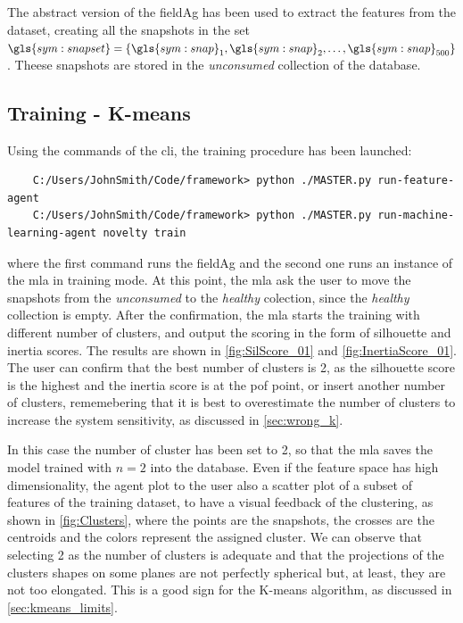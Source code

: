 The abstract version of the \gls{fieldAg} has been used to extract the features from the dataset, creating all the snapshots in the set $\gls{sym:snapset}=\{\gls{sym:snap}_1,\gls{sym:snap}_2,\dots,\gls{sym:snap}_{500}\}$. Theese snapshots are stored in the \emph{unconsumed} collection of the database.

\subsection{Training - K-means}

Using the commands of the \gls{cli}, the training procedure has been launched:
\begin{verbatim}
    C:/Users/JohnSmith/Code/framework> python ./MASTER.py run-feature-agent
    C:/Users/JohnSmith/Code/framework> python ./MASTER.py run-machine-learning-agent novelty train
\end{verbatim}

where the first command runs the \gls{fieldAg} and the second one runs an  instance of the \gls{mla} in training mode.
At this point, the \gls{mla} ask the user to move the snapshots from the \emph{unconsumed} to the \emph{healthy} colection, since the \emph{healthy} collection is empty. After the confirmation, the \gls{mla} starts the training with different number of clusters, and output the scoring in the form of silhouette and inertia scores. The results are shown in \autoref{fig:SilScore_01} and \autoref{fig:InertiaScore_01}. The user can confirm that the best number of clusters is 2, as the silhouette score is the highest and the inertia score is at the \gls{pof} point, or insert another number of clusters, rememebering that it is best to overestimate the number of clusters to increase the system sensitivity, as discussed in \autoref{sec:wrong_k}. 

In this case the number of cluster has been set to 2, so that the \gls{mla} saves the model trained with $n=2$ into the database. Even if the feature space has high dimensionality, the agent plot to the user also a scatter plot of a subset of features of the training dataset, to have a visual feedback of the clustering, as shown in \autoref{fig:Clusters}, where the points are the snapshots, the crosses are the centroids and the colors represent the assigned cluster. We can observe that selecting 2 as the number of clusters is adequate and that the projections of the clusters shapes on some planes are not perfectly spherical but, at least, they are not too elongated. This is a good sign for the K-means algorithm, as discussed in \autoref{sec:kmeans_limits}.

